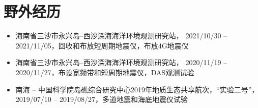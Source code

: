 \section{野外经历}

\begin{itemize}
\item 海南省三沙市永兴岛--西沙深海海洋环境观测研究站，
      2021/10/30 -- 2021/11/05，回收和布放短周期地震仪，布放4G地震仪
\item 海南省三沙市永兴岛--西沙深海海洋环境观测研究站，
      2020/11/19 -- 2020/11/27，布设宽频带和短周期地震仪，DAS观测试验
\item 南海 -- 中国科学院岛礁综合研究中心2019年地质生态共享航次，“实验二号”，
      2019/07/10 -- 2019/08/27，多道地震和海底地震仪试验
\end{itemize}
